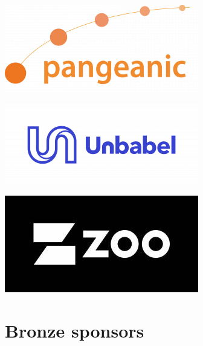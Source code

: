 \documentclass[a4paper,11pt,twoside]{book}
\begin{document}
\begin{center}
\includegraphics[width=0.6\columnwidth]{logos/pangeanic-logo.png}

\vfill

\includegraphics[width=0.6\columnwidth]{logos/unbabel-logo.png}

\vfill

\includegraphics[width=0.6\columnwidth]{logos/zoo-logo.jpg}
\end{center}
\thispagestyle{empty}
\vfill

\newpage

\section*{Bronze sponsors}
\end{document}
